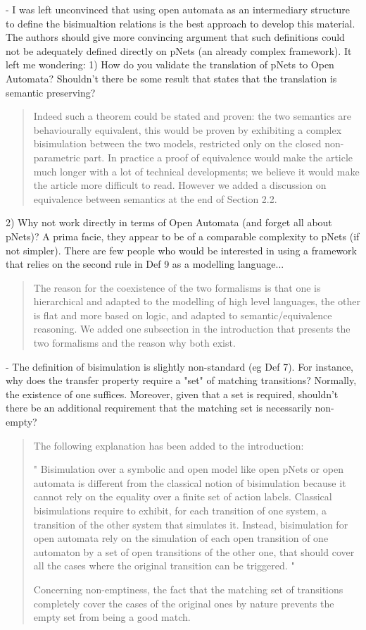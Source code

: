 \documentclass{article}
\begin{document}
- I was left unconvinced that using open automata as an intermediary structure to define the bisimualtion relations is the best approach to develop this material.  The authors should give more convincing argument that such definitions could not be adequately defined directly on pNets (an already complex framework).  It left me wondering:
1) How do you validate the translation of pNets to Open Automata?  Shouldn't there be some result that states that the translation is semantic preserving?   
\begin{quote}
Indeed such a theorem could be stated and proven: the two semantics are behaviourally equivalent, this would be proven by exhibiting a complex bisimulation between the two models, restricted only on the closed non-parametric part. In practice a proof of equivalence would make the article much longer with a lot of technical developments; we believe it would make the article more difficult to read. However we added a discussion on equivalence between semantics at the end of Section 2.2.
\end{quote}
 
2) Why not work directly in terms of Open Automata (and forget all about pNets)?  A prima facie, they appear to be of a comparable complexity to pNets (if not simpler).  There are few people who would be interested in using a framework that relies on the second rule in Def 9 as a modelling language...  
\begin{quote}
The reason for the coexistence of the two formalisms is that one is hierarchical and adapted to the modelling of high level languages, the other is flat and more based on logic, and adapted to semantic/equivalence reasoning.
We added one subsection in the introduction that presents the two formalisms and the reason why both exist.
\end{quote}

- The definition of bisimulation is slightly non-standard (eg Def 7).  For instance, why does the transfer property require a "set" of matching transitions?  Normally, the existence of one suffices.  Moreover, given that a set is required, shouldn't there be an additional requirement that the matching set is necessarily non-empty? 

\begin{quote}
The following explanation has been added to the introduction:

" Bisimulation over a symbolic and open model like open pNets or open automata is  different from the classical notion of bisimulation because it cannot rely on the equality over a finite set of action labels. Classical bisimulations require to exhibit, for each transition of one system, a transition of the other system that simulates it. Instead, bisimulation for open automata  rely on the simulation of each open transition of one automaton by a set of open transitions of the other one, that should cover all the 
cases where the original transition can be triggered.
"

Concerning non-emptiness, the fact that the matching set of transitions completely cover the cases of the original ones by nature prevents the empty set from being a good match. 
\end{quote}
\end{document}
